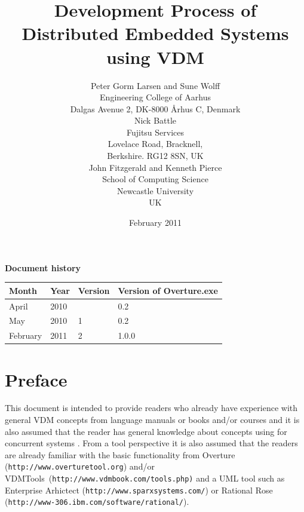 \documentclass{overturerepchap}
\newcommand{\VDMTools}{VDMTools}
\newcommand{\url}[1]{\texttt{#1}}
\begin{document}
\title{Development Process of Distributed Embedded Systems using VDM}
\author{Peter Gorm Larsen and Sune Wolff \\ 
Engineering College of Aarhus\\
Dalgas Avenue 2, DK-8000 \AA{}rhus C, Denmark\\[3mm]
Nick Battle\\
Fujitsu Services\\
Lovelace Road, Bracknell, \\
Berkshire. RG12 8SN, UK\\[3mm]
John Fitzgerald and Kenneth Pierce\\
School of Computing Science\\
Newcastle University\\
UK
}
\date{February 2011}


\maketitle


{\textbf{Document history}}

\begin{tabular}{|l|l|l|l|}\hline
Month   & Year & Version & Version of Overture.exe \\ \hline
April   & 2010 &   & 0.2   \\ \hline
May     & 2010 & 1 & 0.2 \\ \hline
February& 2011 & 2 & 1.0.0\\ \hline
\end{tabular}

\tableofcontents

\chapter*{Preface}

This document is intended to provide readers who already have
experience with general VDM concepts from language manuals
\cite{LangManPP} or books \cite{Fitzgerald&05} and/or courses and it
is also assumed that the reader has general knowledge about concepts
using for concurrent systems
\cite{Ben-Ari82,Hoare85,Chandy&88,Milner89,Lea99}. From a tool perspective
it is also assumed that the readers are already familiar with the
basic functionality from Overture (\url{http://www.overturetool.org}) 
and/or \VDMTools\
(\url{http://www.vdmbook.com/tools.php)} and a UML tool such as
Enterprise Arhictect (\url{http://www.sparxsystems.com/})
or Rational Rose (\url{http://www-306.ibm.com/software/rational/}).
\end{document}
